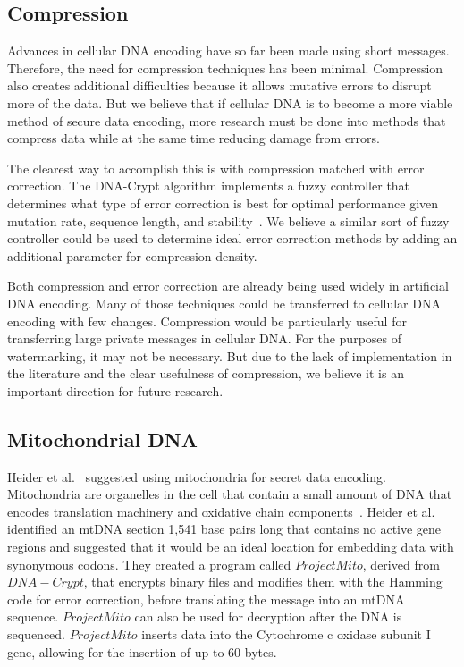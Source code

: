 \documentclass{bioinfo}
\begin{document}
\subsection{Compression}

Advances in cellular DNA encoding have so far been made using short messages. Therefore, the need for compression techniques has been minimal. Compression also creates additional difficulties because it allows mutative errors to disrupt more of the data. But we believe that if cellular DNA is to become a more viable method of secure data encoding, more research must be done into methods that compress data while at the same time reducing damage from errors.

The clearest way to accomplish this is with compression matched with error correction. The DNA-Crypt algorithm implements a fuzzy controller that determines what type of error correction is best for optimal performance given mutation rate, sequence length, and stability~\cite{HBBMC2007}. We believe a similar sort of fuzzy controller could be used to determine ideal error correction methods by adding an additional parameter for compression density.

Both compression and error correction are already being used widely in artificial DNA encoding. Many of those techniques could be transferred to cellular DNA encoding with few changes. Compression would be particularly useful for transferring large private messages in cellular DNA. For the purposes of watermarking, it may not be necessary. But due to the lack of implementation in the literature and the clear usefulness of compression, we believe it is an important direction for future research.

\subsection{Mitochondrial DNA}

Heider et al.~\cite{HKB2008B} suggested using mitochondria for secret data encoding. Mitochondria are organelles in the cell that contain a small amount of DNA that encodes translation machinery and oxidative chain components~\cite{GV2001G}. Heider et al. identified an mtDNA section 1,541 base pairs long that contains no active gene regions and suggested that it would be an ideal location for embedding data with synonymous codons. They created a program called $Project Mito$, derived from $DNA-Crypt$, that encrypts binary files and modifies them with the Hamming code for error correction, before translating the message into an mtDNA sequence. $Project Mito$ can also be used for decryption after the DNA is sequenced. $Project Mito$ inserts data into the Cytochrome c oxidase subunit I gene, allowing for the insertion of up to 60 bytes.
\end{document}
